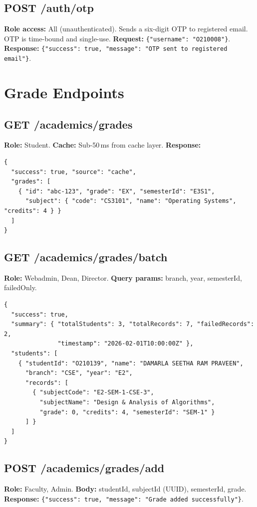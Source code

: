 \documentclass[12pt,a4paper]{report}
\newcommand{\code}[1]{\texttt{#1}}
\begin{document}
\subsection{POST /auth/otp}

\textbf{Role access:} All (unauthenticated). Sends a six-digit OTP to registered email. OTP is time-bound and single-use. \textbf{Request:} \code{\{"username": "O210008"\}}. \textbf{Response:} \code{\{"success": true, "message": "OTP sent to registered email"\}}.

\section{Grade Endpoints}

\subsection{GET /academics/grades}
\textbf{Role:} Student. \textbf{Cache:} Sub-50\,ms from cache layer. \textbf{Response:}
\begin{lstlisting}[caption={Student grades},label={lst:grades}]
{
  "success": true, "source": "cache",
  "grades": [
    { "id": "abc-123", "grade": "EX", "semesterId": "E3S1",
      "subject": { "code": "CS3101", "name": "Operating Systems", "credits": 4 } }
  ]
}
\end{lstlisting}

\subsection{GET /academics/grades/batch}
\textbf{Role:} Webadmin, Dean, Director. \textbf{Query params:} branch, year, semesterId, failedOnly.
\begin{lstlisting}[caption={Batch grades response},label={lst:batchgrades}]
{
  "success": true,
  "summary": { "totalStudents": 3, "totalRecords": 7, "failedRecords": 2,
               "timestamp": "2026-02-01T10:00:00Z" },
  "students": [
    { "studentId": "O210139", "name": "DAMARLA SEETHA RAM PRAVEEN",
      "branch": "CSE", "year": "E2",
      "records": [
        { "subjectCode": "E2-SEM-1-CSE-3",
          "subjectName": "Design & Analysis of Algorithms",
          "grade": 0, "credits": 4, "semesterId": "SEM-1" }
      ] }
  ]
}
\end{lstlisting}

\subsection{POST /academics/grades/add}
\textbf{Role:} Faculty, Admin. \textbf{Body:} studentId, subjectId (UUID), semesterId, grade. \textbf{Response:} \code{\{"success": true, "message": "Grade added successfully"\}}.
\end{document}
